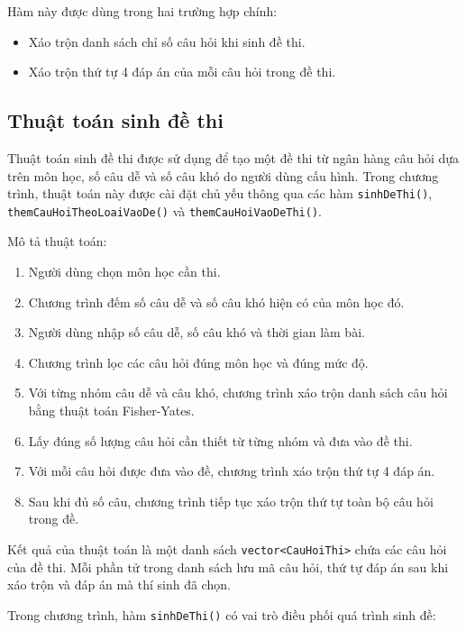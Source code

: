 \documentclass[12pt,a4paper]{report}
\begin{document}
Hàm này được dùng trong hai trường hợp chính:

\begin{itemize}
    \item Xáo trộn danh sách chỉ số câu hỏi khi sinh đề thi.
    \item Xáo trộn thứ tự 4 đáp án của mỗi câu hỏi trong đề thi.
\end{itemize}

\subsection{Thuật toán sinh đề thi}

Thuật toán sinh đề thi được sử dụng để tạo một đề thi từ ngân hàng câu hỏi dựa trên môn học, số câu dễ và số câu khó do người dùng cấu hình. Trong chương trình, thuật toán này được cài đặt chủ yếu thông qua các hàm \texttt{sinhDeThi()}, \texttt{themCauHoiTheoLoaiVaoDe()} và \texttt{themCauHoiVaoDeThi()}.

Mô tả thuật toán:

\begin{enumerate}
    \item Người dùng chọn môn học cần thi.
    \item Chương trình đếm số câu dễ và số câu khó hiện có của môn học đó.
    \item Người dùng nhập số câu dễ, số câu khó và thời gian làm bài.
    \item Chương trình lọc các câu hỏi đúng môn học và đúng mức độ.
    \item Với từng nhóm câu dễ và câu khó, chương trình xáo trộn danh sách câu hỏi bằng thuật toán Fisher-Yates.
    \item Lấy đúng số lượng câu hỏi cần thiết từ từng nhóm và đưa vào đề thi.
    \item Với mỗi câu hỏi được đưa vào đề, chương trình xáo trộn thứ tự 4 đáp án.
    \item Sau khi đủ số câu, chương trình tiếp tục xáo trộn thứ tự toàn bộ câu hỏi trong đề.
\end{enumerate}

Kết quả của thuật toán là một danh sách \texttt{vector<CauHoiThi>} chứa các câu hỏi của đề thi. Mỗi phần tử trong danh sách lưu mã câu hỏi, thứ tự đáp án sau khi xáo trộn và đáp án mà thí sinh đã chọn.

Trong chương trình, hàm \texttt{sinhDeThi()} có vai trò điều phối quá trình sinh đề:
\end{document}

